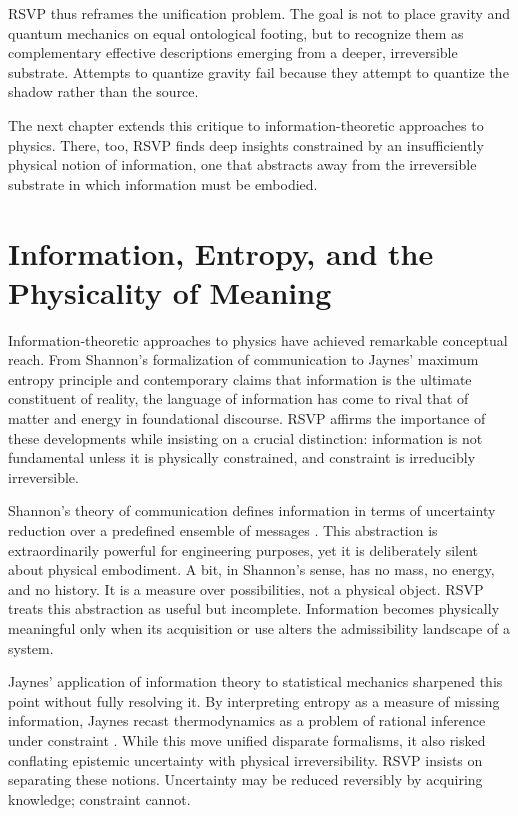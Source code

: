\documentclass[11pt,oneside]{book}
\begin{document}
RSVP thus reframes the unification problem. The goal is not to place gravity and quantum mechanics on equal ontological footing, but to recognize them as complementary effective descriptions emerging from a deeper, irreversible substrate. Attempts to quantize gravity fail because they attempt to quantize the shadow rather than the source.

The next chapter extends this critique to information-theoretic approaches to physics. There, too, RSVP finds deep insights constrained by an insufficiently physical notion of information, one that abstracts away from the irreversible substrate in which information must be embodied.

\chapter{Information, Entropy, and the Physicality of Meaning}

Information-theoretic approaches to physics have achieved remarkable conceptual reach. From Shannon’s formalization of communication to Jaynes’ maximum entropy principle and contemporary claims that information is the ultimate constituent of reality, the language of information has come to rival that of matter and energy in foundational discourse. RSVP affirms the importance of these developments while insisting on a crucial distinction: information is not fundamental unless it is physically constrained, and constraint is irreducibly irreversible.

Shannon’s theory of communication defines information in terms of uncertainty reduction over a predefined ensemble of messages \cite{shannon1948}. This abstraction is extraordinarily powerful for engineering purposes, yet it is deliberately silent about physical embodiment. A bit, in Shannon’s sense, has no mass, no energy, and no history. It is a measure over possibilities, not a physical object. RSVP treats this abstraction as useful but incomplete. Information becomes physically meaningful only when its acquisition or use alters the admissibility landscape of a system.

Jaynes’ application of information theory to statistical mechanics sharpened this point without fully resolving it. By interpreting entropy as a measure of missing information, Jaynes recast thermodynamics as a problem of rational inference under constraint \cite{jaynes1957}. While this move unified disparate formalisms, it also risked conflating epistemic uncertainty with physical irreversibility. RSVP insists on separating these notions. Uncertainty may be reduced reversibly by acquiring knowledge; constraint cannot.
\end{document}
